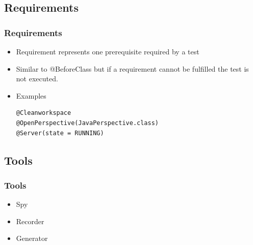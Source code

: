 \documentclass{beamer}
\begin{document}
\subsection{Requirements}
\begin{frame}[fragile]
\frametitle{Requirements}
\begin{itemize}
\item Requirement represents one prerequisite required by a test
\item Similar to @BeforeClass but if a requirement cannot be fulfilled the test is not executed.
\item Examples
\begin{lstlisting}
@Cleanworkspace 
@OpenPerspective(JavaPerspective.class)
@Server(state = RUNNING)
\end{lstlisting}
\end{itemize}
\end{frame}

\subsection{Tools}
\begin{frame}[fragile]
\frametitle{Tools}
\begin{itemize}
\item Spy
\item Recorder
\item Generator
\end{itemize}
\end{frame}
\end{document}

